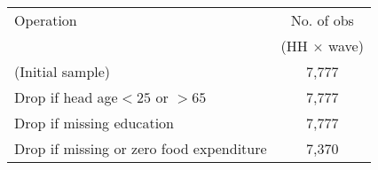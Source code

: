\begin{tabular}{l|c}
\toprule
Operation & No. of obs \\
                  & (HH $\times$ wave) \\
\midrule
 (Initial sample)                                                                                      & 7,777  \\
Drop if head age$<25$ or $>65$                                                         & 7,777      \\
Drop if missing education                                                                      & 7,777      \\
Drop if missing or zero food expenditure                                       & 7,370      \\
\bottomrule
\end{tabular}